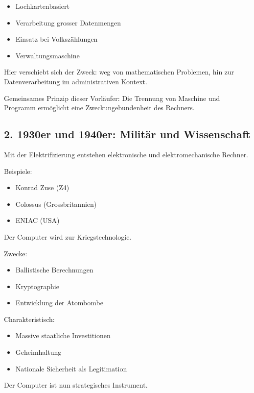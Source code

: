 \begin{itemize}
    \item Lochkartenbasiert
    \item Verarbeitung grosser Datenmengen
    \item Einsatz bei Volkszählungen
    \item Verwaltungsmaschine
\end{itemize}

Hier verschiebt sich der Zweck: weg von mathematischen Problemen, 
hin zur Datenverarbeitung im administrativen Kontext.

Gemeinsames Prinzip dieser Vorläufer:
Die Trennung von Maschine und Programm ermöglicht 
eine Zweckungebundenheit des Rechners.

\subsection{2. 1930er und 1940er: Militär und Wissenschaft}

Mit der Elektrifizierung entstehen elektronische und elektromechanische Rechner.

Beispiele:

\begin{itemize}
    \item Konrad Zuse (Z4)
    \item Colossus (Grossbritannien)
    \item ENIAC (USA)
\end{itemize}

Der Computer wird zur Kriegstechnologie.

Zwecke:

\begin{itemize}
    \item Ballistische Berechnungen
    \item Kryptographie
    \item Entwicklung der Atombombe
\end{itemize}

Charakteristisch:

\begin{itemize}
    \item Massive staatliche Investitionen
    \item Geheimhaltung
    \item Nationale Sicherheit als Legitimation
\end{itemize}

Der Computer ist nun strategisches Instrument.

